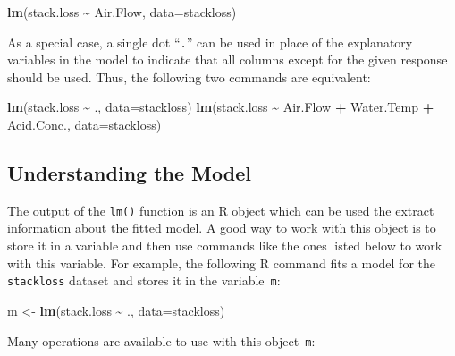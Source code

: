 \documentclass[
  a4paper,
]{article}
\newenvironment{Shaded}{\begin{snugshade}}{\end{snugshade}}
\newcommand{\AttributeTok}[1]{\textcolor[rgb]{0.13,0.29,0.53}{#1}}
\newcommand{\FunctionTok}[1]{\textcolor[rgb]{0.13,0.29,0.53}{\textbf{#1}}}
\newcommand{\NormalTok}[1]{#1}
\newcommand{\OtherTok}[1]{\textcolor[rgb]{0.56,0.35,0.01}{#1}}
\newcommand{\SpecialCharTok}[1]{\textcolor[rgb]{0.81,0.36,0.00}{\textbf{#1}}}
\theoremstyle{definition}
\theoremstyle{definition}
\theoremstyle{definition}
\theoremstyle{definition}
\theoremstyle{remark}
\begin{document}
\begin{itemize}
\begin{Shaded}
\begin{Highlighting}[]
  \FunctionTok{lm}\NormalTok{(stack.loss }\SpecialCharTok{\textasciitilde{}}\NormalTok{ Air.Flow, }\AttributeTok{data=}\NormalTok{stackloss)}
\end{Highlighting}
\end{Shaded}

  As a special case, a single dot ``\texttt{.}'' can be used in place of
  the explanatory variables in the model to indicate that all columns
  except for the given response should be used. Thus, the following
  two commands are equivalent:

\begin{Shaded}
\begin{Highlighting}[]
  \FunctionTok{lm}\NormalTok{(stack.loss }\SpecialCharTok{\textasciitilde{}}\NormalTok{ ., }\AttributeTok{data=}\NormalTok{stackloss)}
  \FunctionTok{lm}\NormalTok{(stack.loss }\SpecialCharTok{\textasciitilde{}}\NormalTok{ Air.Flow }\SpecialCharTok{+}\NormalTok{ Water.Temp }\SpecialCharTok{+}\NormalTok{ Acid.Conc., }\AttributeTok{data=}\NormalTok{stackloss)}
\end{Highlighting}
\end{Shaded}
\end{itemize}

\subsection*{Understanding the Model}\label{lm-model}

The output of the \texttt{lm()} function is an R object which can be used the extract
information about the fitted model. A good way to work with this object is to
store it in a variable and then use commands like the ones listed below to work
with this variable. For example, the following R command fits a model for the
\texttt{stackloss} dataset and stores it in the variable~\texttt{m}:

\begin{Shaded}
\begin{Highlighting}[]
\NormalTok{  m }\OtherTok{\textless{}{-}} \FunctionTok{lm}\NormalTok{(stack.loss }\SpecialCharTok{\textasciitilde{}}\NormalTok{ ., }\AttributeTok{data=}\NormalTok{stackloss)}
\end{Highlighting}
\end{Shaded}

Many operations are available to use with this object~\texttt{m}:
\end{document}

